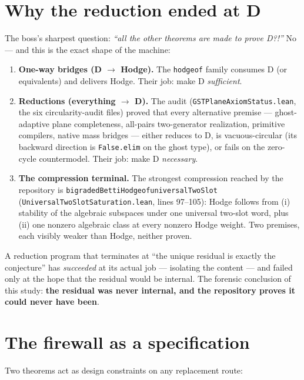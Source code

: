 \documentclass[11pt]{article}
\renewcommand{\_}{\textunderscore\allowbreak}
\begin{document}
\section{Why the reduction ended at D}\label{sec:reduction}

The boss's sharpest question: \emph{``all the other theorems are made to prove
D?!''} No --- and this is the exact shape of the machine:

\begin{enumerate}[leftmargin=2em]
\item \textbf{One-way bridges (D $\to$ Hodge).} The
\texttt{hodge\_of\_*} family consumes D (or equivalents) and delivers Hodge.
Their job: make D \emph{sufficient}.
\item \textbf{Reductions (everything $\to$ D).} The audit
(\texttt{GSTPlaneAxiomStatus.lean}, the six circularity-audit files) proved
that every alternative premise --- ghost-adaptive plane completeness, all-pairs
two-generator realization, primitive compilers, native mass bridges ---
either reduces to D, is vacuous-circular (its backward direction is
\texttt{False.elim} on the ghost type), or fails on the zero-cycle
countermodel. Their job: make D \emph{necessary}.
\item \textbf{The compression terminal.} The strongest compression reached by
the repository is \texttt{bigradedBettiHodge\_of\_universalTwoSlot}
(\texttt{UniversalTwoSlotSaturation.lean}, lines 97--105): Hodge follows from
(i) stability of the algebraic subspaces under one universal two-slot word,
plus (ii) one nonzero algebraic class at every nonzero Hodge weight. Two
premises, each visibly weaker than Hodge, neither proven.
\end{enumerate}

A reduction program that terminates at ``the unique residual is exactly the
conjecture'' has \emph{succeeded} at its actual job --- isolating the content
--- and failed only at the hope that the residual would be internal. The
forensic conclusion of this study: \textbf{the residual was never internal, and
the repository proves it could never have been}.

\section{The firewall as a specification}\label{sec:firewall}

Two theorems act as design constraints on any replacement route:
\end{document}

